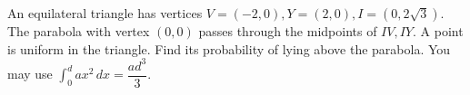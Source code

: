 An equilateral triangle has vertices $V=(-2,0),Y=(2,0),I=(0,2\sqrt3)$. The parabola with vertex $(0,0)$ passes through the midpoints of $IV,IY$. A point is uniform in the triangle. Find its probability of lying above the parabola. You may use $\int_0^d ax^2\,dx=\dfrac{ad^3}{3}$.
